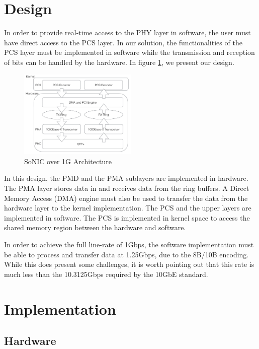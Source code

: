 \documentclass[conference]{IEEEtran}
\begin{document}
\section{Design}

In order to provide real-time access to the PHY layer in software, the user must have direct access to the PCS layer. In our solution, the functionalities of the PCS layer must be implemented in software while the transmission and reception of bits can be handled by the hardware. In figure \ref{fig:design}, we present our design.

\begin{figure}[t]
  \centering
  \includegraphics[width=0.5\textwidth]{images/design.pdf}
  \caption{SoNIC over 1G Architecture}
  \label{fig:design}
\end{figure}

In this design, the PMD and the PMA sublayers are implemented in hardware. The PMA layer stores data in and receives data from the ring buffers. A Direct Memory Access (DMA) engine must also be used to transfer the data from the hardware layer to the kernel implementation. The PCS and the upper layers are implemented in software. The PCS is implemented in kernel space to access the shared memory region between the hardware and software.

In order to achieve the full line-rate of 1Gbps, the software implementation must be able to process and transfer data at 1.25Gbps, due to the 8B/10B encoding. While this does present some challenges, it is worth pointing out that this rate is much less than the 10.3125Gbps required by the 10GbE standard.

\section{Implementation}

\subsection{Hardware}
\end{document}
